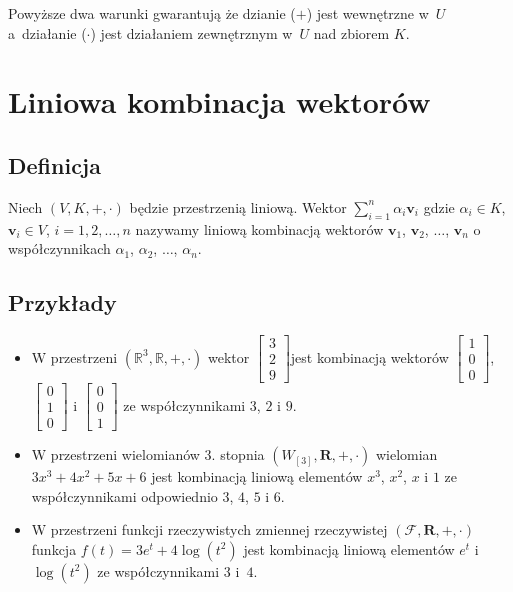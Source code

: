 \documentclass{article}
\begin{document}
Powyższe dwa warunki gwarantują że dzianie ($+$) jest wewnętrzne w~$U$ a~działanie ($\cdot$) jest działaniem zewnętrznym w~$U$ nad zbiorem $K$.

\section{Liniowa kombinacja wektorów}
\subsection{Definicja}
Niech $(V, K, +, \cdot)$ będzie przestrzenią liniową.
Wektor $\sum_{i=1}^{n}\alpha_{i}\mathbf{v}_{i}$ gdzie $\alpha_{i} \in K$, $\mathbf{v}_{i} \in V$, $i=1, 2, \dots, n$ nazywamy liniową kombinacją wektorów $\mathbf{v}_{1}$, $\mathbf{v}_{2}$, $\dots$, $\mathbf{v}_{n}$ o współczynnikach $\alpha_{1}$, $\alpha_{2}$, $\dots$, $\alpha_{n}$.

\subsection{Przykłady}
\begin{itemize}
    \item W przestrzeni $(\mathbb{R}^{3}, \mathbb{R}, +, \cdot)$ wektor $\begin{bmatrix} 3 \\ 2\\ 9 \end{bmatrix}$jest kombinacją wektorów $\begin{bmatrix} 1 \\ 0\\ 0 \end{bmatrix}$, $\begin{bmatrix} 0 \\ 1\\ 0 \end{bmatrix}$ i $\begin{bmatrix} 0 \\ 0\\ 1 \end{bmatrix}$ ze współczynnikami $3$, $2$ i $9$.
    \item W przestrzeni wielomianów 3. stopnia $(W_{[3]},\mathbf{R}, +,\cdot)$ wielomian $3x^{3} + 4x^{2} + 5x + 6$ jest kombinacją liniową elementów $x^{3}$, $x^{2}$, $x$ i $1$ ze współczynnikami odpowiednio $3$, $4$, $5$ i $6$.
    \item W przestrzeni funkcji rzeczywistych zmiennej rzeczywistej $(\mathcal{F}, \mathbf{R} , +,\cdot)$ funkcja $f(t) = 3e^{t} + 4\log(t^2)$ jest kombinacją liniową elementów $e^{t}$ i~$\log(t^2)$ ze współczynnikami $3$ i~$4$.
\end{itemize}
\end{document}
